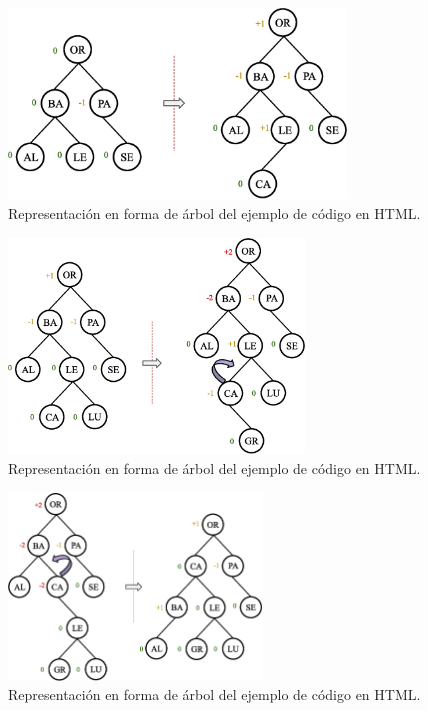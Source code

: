 \begin{figure}[htpb!]
  \begin{center}
    \includegraphics[width=0.8\textwidth]{images/AVLInsertion4.eps}
  \end{center}
  \caption{Representación en forma de árbol del ejemplo de código en HTML.}
  \label{fig:AVLInsertion4}
\end{figure}


\begin{figure}[htpb!]
  \begin{center}
    \includegraphics[width=0.7\textwidth]{images/AVLInsertion5.eps}
  \end{center}
  \caption{Representación en forma de árbol del ejemplo de código en HTML.}
  \label{fig:AVLInsertion5}
\end{figure}


\begin{figure}[htpb!]
  \begin{center}
    \includegraphics[width=0.6\textwidth]{images/AVLInsertion6.eps}
  \end{center}
  \caption{Representación en forma de árbol del ejemplo de código en HTML.}
  \label{fig:AVLInsertion6}
\end{figure}
